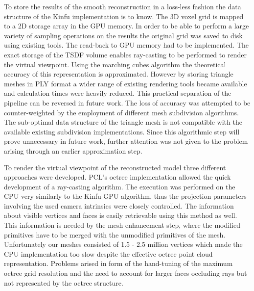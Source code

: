 \documentclass{ucl_thesis}
\begin{document}
\par To  store the results of the smooth reconstruction in a loss-less fashion the data structure of the Kinfu implementation is to know. The 3D voxel grid is mapped to a 2D storage array in the GPU memory. In order to be able to perform a large variety of sampling operations on the results the original grid was saved to disk using existing tools. The read-back to GPU memory had to be implemented. The exact storage of the TSDF volume enables ray-casting to be performed to render the virtual viewpoint. Using the marching cubes algorithm the theoretical accuracy of this representation is approximated. However by storing triangle meshes in PLY format a wider range of existing rendering tools became available and calculation times were heavily reduced. This practical separation of the pipeline can be reversed in future work. The loss of accuracy was attempted to be counter-weighted by the employment of different mesh subdivision algorithms. The sub-optimal data structure of the triangle mesh is not compatible with the available existing subdivision implementations. Since this algorithmic step will prove unnecessary in future work, further attention was not given to the problem arising through an earlier approximation step.

\par To render the virtual viewpoint of the reconstructed model three different approaches were developed. PCL's octree implementation allowed the quick development of a ray-casting algorithm. The execution was performed on the CPU very similarly to the Kinfu GPU algorithm, thus the projection parameters involving the used camera intrinsics were closely controlled. The information about visible vertices and faces is easily retrievable using this method as well. This information is needed by the mesh enhancement step, where the modified primitives have to be merged with the unmodified primitives of the mesh. Unfortunately our meshes consisted of 1.5 - 2.5 million vertices which made the CPU implementation too slow despite the effective octree point cloud representation. Problems arised in form of the hand-tuning of the maximum octree grid resolution and the need to account for larger faces occluding rays but not represented by the octree structure.
\end{document}
